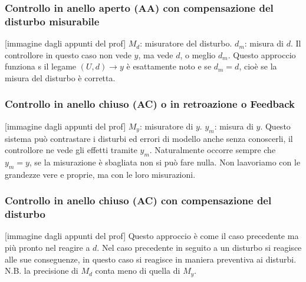 \subsubsection{Controllo in anello aperto (AA) con compensazione del disturbo misurabile}
[immagine dagli appunti del prof]\newline
$M_d$: misuratore del disturbo.\newline
$d_m$: misura di $d$.\newline
Il controllore in questo caso non vede $y$, ma vede $d$, o meglio $d_m$.\newline
Questo approccio funziona s il legame $(U,d) \rightarrow y$ è esattamente noto e se $d_m = d$, cioè se la misura del disturbo è corretta.
\subsubsection{Controllo in anello chiuso (AC) o in retroazione o Feedback}
[immagine dagli appunti del prof]\newline
$M_y$: misuratore di $y$.\newline
$y_m$: misura di $y$.\newline
Questo sistema può contrastare i disturbi ed errori di modello anche senza conoscerli, il controllore ne vede gli effetti tramite $y_m$.\newline
Naturalmente occorre sempre che $y_m = y$, se la misurazione è sbagliata non si può fare nulla. Non laavoriamo con le grandezze vere e proprie, ma con le loro misurazioni.
\subsubsection{Controllo in anello chiuso (AC) con compensazione del disturbo}
[immagine dagli appunti del prof]\newline
Questo approccio è come il caso precedente ma più pronto nel reagire a $d$. Nel caso precedente in seguito a un disturbo si reagisce alle sue conseguenze, in questo caso si reagisce in maniera preventiva ai disturbi.\newline
N.B. la precisione di $M_d$ conta meno di quella di $M_y$.\newline
\newline
